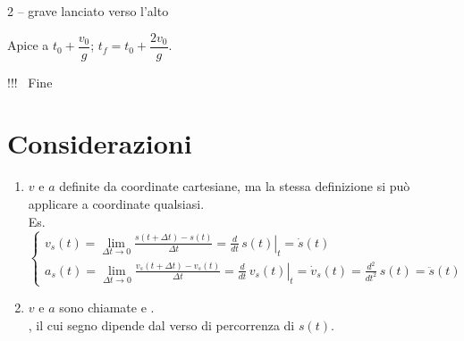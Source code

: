 \documentclass[11pt,a4paper,openany]{report}
\begin{document}
\begin{esempio}{2 -- grave lanciato verso l'alto}
\begin{disegno}
\end{disegno}
Apice a $t_0 + \dfrac{v_0}{g}$; \quad $t_f = t_0 + \dfrac{2v_0}{g}$.
\end{esempio}

\begin{delucidazione}
!!! \ Fine
\end{delucidazione}

\section{Considerazioni}
\begin{enumerate}[label=(\Roman*)]
  \item $v$ e $a$ definite da coordinate cartesiane, ma la stessa definizione si può
        applicare a coordinate qualsiasi.\\
        Es.\ \implica {}
  \[
    \begin{cases}
      v_s(t) = \displaystyle\lim_{\Delta t \to 0} \frac{s(t + \Delta t) - s(t)}{\Delta t}
             = \left.\frac{d}{dt}\,s(t)\right|_t = \dot{s}(t) \\[2.5ex]
      a_s(t) = \displaystyle\lim_{\Delta t \to 0} \frac{v_s(t + \Delta t) - v_s(t)}{\Delta t}
             = \left.\frac{d}{dt}\,v_s(t)\right|_t = \dot{v}_s(t) = \frac{d^2}{dt^2}\,s(t) = \ddot{s}(t)
    \end{cases}
  \]
  \item $v$ e $a$ sono chiamate  e .\\
        , il cui segno dipende dal verso di percorrenza di $s(t)$.
\end{enumerate}

\end{document}
